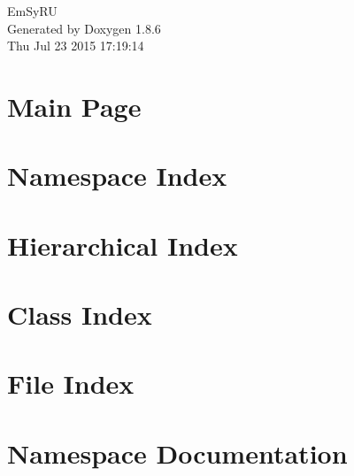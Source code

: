 \documentclass[twoside]{book}
\newcommand{\clearemptydoublepage}{%
  \newpage{\pagestyle{empty}\cleardoublepage}%
}
\begin{document}
\hypersetup{pageanchor=false}
\begin{titlepage}
\vspace*{7cm}
\begin{center}%
{\Large Em\-Sy\-R\-U }\\
\vspace*{1cm}
{\large Generated by Doxygen 1.8.6}\\
\vspace*{0.5cm}
{\small Thu Jul 23 2015 17:19:14}\\
\end{center}
\end{titlepage}
\clearemptydoublepage
\tableofcontents
\clearemptydoublepage
{}
\hypersetup{pageanchor=true}

\chapter{Main Page}
\label{index}\hypertarget{index}{}
\chapter{Namespace Index}

\chapter{Hierarchical Index}

\chapter{Class Index}

\chapter{File Index}

\chapter{Namespace Documentation}

\end{document}
